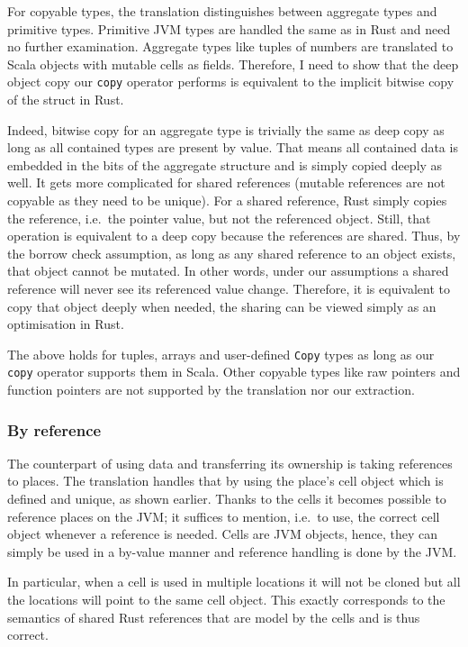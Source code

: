 For copyable types, the translation distinguishes between aggregate types and
primitive types. Primitive JVM types are handled the same as in Rust and need no
further examination. Aggregate types like tuples of numbers are translated to
Scala objects with mutable cells as fields. Therefore, I need to show that the
deep object copy our \lstinline!copy! operator performs is equivalent to the
implicit bitwise copy of the struct in Rust.

Indeed, bitwise copy for an aggregate type is trivially the same as deep copy as
long as all contained types are present by value. That means all contained data
is embedded in the bits of the aggregate structure and is simply copied deeply
as well. It gets more complicated for shared references (mutable references are
not copyable as they need to be unique). For a shared reference, Rust simply
copies the reference, i.e.~the pointer value, but not the referenced object.
Still, that operation is equivalent to a deep copy because the references are
shared. Thus, by the borrow check assumption, as long as any shared reference to
an object exists, that object cannot be mutated. In other words, under our
assumptions a shared reference will never see its referenced value change.
Therefore, it is equivalent to copy that object deeply when needed, the sharing
can be viewed simply as an optimisation in Rust.

The above holds for tuples, arrays and user-defined \lstinline!Copy! types as
long as our \lstinline!copy! operator supports them in Scala. Other copyable
types like raw pointers and function pointers are not supported by the
translation nor our extraction.

\subsubsection{By reference}

The counterpart of using data and transferring its ownership is taking
references to places. The translation handles that by using the place's cell
object which is defined and unique, as shown earlier. Thanks to the cells it
becomes possible to reference places on the JVM; it suffices to mention, i.e.~to
use, the correct cell object whenever a reference is needed. Cells are JVM
objects, hence, they can simply be used in a by-value manner and reference
handling is done by the JVM.

In particular, when a cell is used in multiple locations it will not be cloned
but all the locations will point to the same cell object. This exactly
corresponds to the semantics of shared Rust references that are model by the
cells and is thus correct.


